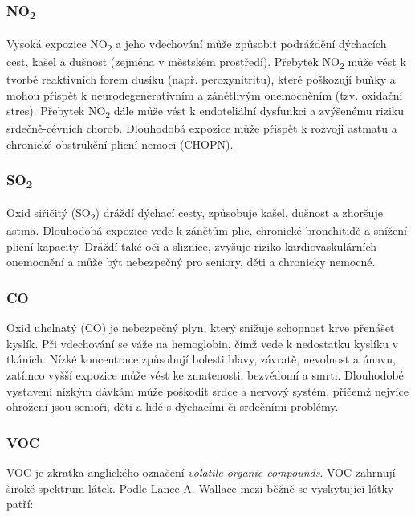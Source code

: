 \subsubsection{NO\textsubscript{2}}

Vysoká expozice NO\textsubscript{2} a jeho vdechování může způsobit podráždění dýchacích cest, kašel a dušnost (zejména v městském prostředí).
Přebytek NO\textsubscript{2} může vést k tvorbě reaktivních forem dusíku (např. peroxynitritu), které poškozují buňky a mohou přispět k neurodegenerativním a zánětlivým onemocněním (tzv. oxidační stres). Přebytek NO\textsubscript{2} dále může vést k endoteliální dysfunkci a zvýšenému riziku srdečně-cévních chorob.
Dlouhodobá expozice může přispět k rozvoji astmatu a chronické obstrukční plicní nemoci (CHOPN). \parencite{usepaNitrogenDioxidesImpact2014}

\subsubsection{SO\textsubscript{2}}

Oxid siřičitý (SO\textsubscript{2}) dráždí dýchací cesty, způsobuje kašel, dušnost a zhoršuje astma. Dlouhodobá expozice vede k zánětům plic, chronické bronchitidě a snížení plicní kapacity. Dráždí také oči a sliznice, zvyšuje riziko kardiovaskulárních onemocnění a může být nebezpečný pro seniory, děti a chronicky nemocné.\parencite{usepaSulfurDioxideBasics2016}

\subsubsection{CO}

Oxid uhelnatý (CO) je nebezpečný plyn, který snižuje schopnost krve přenášet kyslík. Při vdechování se váže na hemoglobin, čímž vede k nedostatku kyslíku v tkáních. Nízké koncentrace způsobují bolesti hlavy, závratě, nevolnost a únavu, zatímco vyšší expozice může vést ke zmatenosti, bezvědomí a smrti. Dlouhodobé vystavení nízkým dávkám může poškodit srdce a nervový systém, přičemž nejvíce ohroženi jsou senioři, děti a lidé s dýchacími či srdečními problémy.\parencite{usepaBasicInformationCarbon2016}

\subsubsection{VOC}
VOC je zkratka anglického označení \textit{volatile organic compounds}.
VOC zahrnují široké spektrum látek. Podle Lance A. Wallace mezi běžně se vyskytující látky patří: \parencite{lancea.wallaceVOLATILEORGANICCOMPOUNDS1991}

